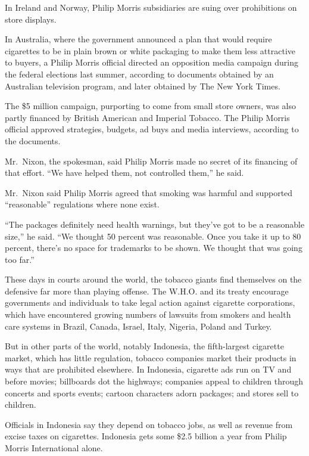 ﻿\documentclass[12pt]{article}
\begin{document}
In Ireland and Norway, Philip Morris subsidiaries are suing over prohibitions on store displays.

In Australia, where the government announced a plan that would require cigarettes to be in plain
brown or white packaging to make them less attractive to buyers, a Philip Morris official directed
an opposition media campaign during the federal elections last summer, according to documents
obtained by an Australian television program, and later obtained by The New York Times.

The \$5 million campaign, purporting to come from small store owners, was also partly financed by
British American and Imperial Tobacco. The Philip Morris official approved strategies, budgets, ad
buys and media interviews, according to the documents.

Mr.~Nixon, the spokesman, said Philip Morris made no secret of its financing of that effort. ``We
have helped them, not controlled them,'' he said.

Mr.~Nixon said Philip Morris agreed that smoking was harmful and supported ``reasonable''
regulations where none exist.

``The packages definitely need health warnings, but they've got to be a reasonable size,'' he said.
``We thought 50 percent was reasonable. Once you take it up to 80 percent, there's no space for
trademarks to be shown. We thought that was going too far.''

These days in courts around the world, the tobacco giants find themselves on the defensive far more
than playing offense. The W.H.O. and its treaty encourage governments and individuals to take legal
action against cigarette corporations, which have encountered growing numbers of lawsuits from
smokers and health care systems in Brazil, Canada, Israel, Italy, Nigeria, Poland and Turkey.

But in other parts of the world, notably Indonesia, the fifth-largest cigarette market, which has
little regulation, tobacco companies market their products in ways that are prohibited elsewhere. In
Indonesia, cigarette ads run on TV and before movies; billboards dot the highways; companies appeal
to children through concerts and sports events; cartoon characters adorn packages; and stores sell
to children.

Officials in Indonesia say they depend on tobacco jobs, as well as revenue from excise taxes on
cigarettes. Indonesia gets some \$2.5 billion a year from Philip Morris International alone.
\end{document}
